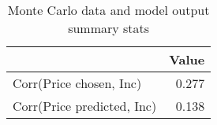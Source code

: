 \begin{table}[!ht]
	\centering
		\caption{Monte Carlo data and model output summary stats}
\begin{tabular}{lr}
		\toprule
               &     Value\\
		\midrule
		Corr(Price chosen, Inc)&     0.277\\
		Corr(Price predicted, Inc)&     0.138\\
		\bottomrule
	\end{tabular}
\end{table}
